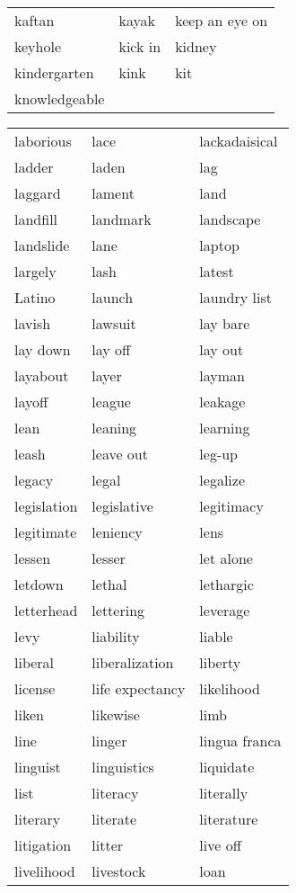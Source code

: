 \documentclass{minimal}
\begin{document}
\begin{longtable}{p{2.8cm}p{2.8cm}p{2.8cm}}
kaftan & kayak & keep an eye on \\
keyhole & kick in & kidney \\
kindergarten & kink & kit \\
knowledgeable
\end{longtable}

\begin{longtable}{p{2.8cm}p{2.8cm}p{2.8cm}}
laborious & lace & lackadaisical \\
ladder & laden & lag \\
laggard & lament & land \\
landfill & landmark & landscape \\
landslide & lane & laptop \\
largely & lash & latest \\
Latino & launch & laundry list \\
lavish & lawsuit & lay bare \\
lay down & lay off & lay out \\
layabout & layer & layman \\
layoff & league & leakage \\
lean & leaning & learning \\
leash & leave out & leg-up \\
legacy & legal & legalize \\
legislation & legislative & legitimacy \\
legitimate & leniency & lens \\
lessen & lesser & let alone \\
letdown & lethal & lethargic \\
letterhead & lettering & leverage \\
levy & liability & liable \\
liberal & liberalization & liberty \\
license & life expectancy & likelihood \\
liken & likewise & limb \\
line & linger & lingua franca \\
linguist & linguistics & liquidate \\
list & literacy & literally \\
literary & literate & literature \\
litigation & litter & live off \\
livelihood & livestock & loan \\

\end{longtable}
\end{document}
